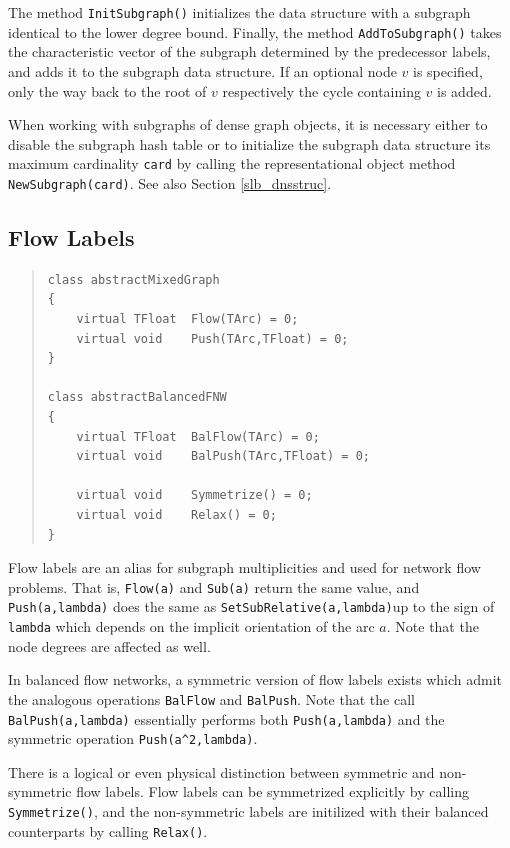 \documentclass[a4paper,11pt,twoside]{book}
\begin{document}
\begin{multicols}{2}
The method \verb/InitSubgraph()/ initializes the data structure with a
subgraph identical to the lower degree bound. Finally, the method
\verb/AddToSubgraph()/ takes the characteristic vector of the subgraph determined
by the predecessor labels, and adds it to the subgraph data structure.
If an optional node $v$ is specified, only the way back to the root of
$v$ respectively the cycle containing $v$ is added.

When working with subgraphs of dense graph objects, it is necessary either to
disable the subgraph hash table or to initialize the subgraph data structure
its maximum cardinality \verb/card/ by calling the representational object method
\verb/NewSubgraph(card)/. See also Section \ref{slb_dnsstruc}.


\subsection{Flow Labels}
\label{slb_flow}
\methods
\begin{quote}
\begin{verbatim}
class abstractMixedGraph
{
    virtual TFloat  Flow(TArc) = 0;
    virtual void    Push(TArc,TFloat) = 0;
}

class abstractBalancedFNW
{
    virtual TFloat  BalFlow(TArc) = 0;
    virtual void    BalPush(TArc,TFloat) = 0;

    virtual void    Symmetrize() = 0;
    virtual void    Relax() = 0;
}
\end{verbatim}
\end{quote}
Flow labels are an alias for subgraph multiplicities and used for network flow
problems. That is, \verb/Flow(a)/ and \verb/Sub(a)/ return the same value, and
\verb/Push(a,lambda)/ does the same as \verb/SetSubRelative(a,lambda)/up to the
sign of \verb/lambda/ which depends on the implicit orientation of the arc $a$.
Note that the node degrees are affected as well.

In balanced flow networks, a symmetric version of flow labels exists which
admit the analogous operations \verb/BalFlow/ and \verb/BalPush/. Note that
the call \verb/BalPush(a,lambda)/ essentially performs both
\verb/Push(a,lambda)/ and the symmetric operation \verb/Push(a^2,lambda)/.

There is a logical or even physical distinction
between symmetric and non-symmetric flow labels. Flow labels can be symmetrized
explicitly by calling \verb/Symmetrize()/, and the non-symmetric labels are
initilized with their balanced counterparts by calling \verb/Relax()/.



\end{multicols}
\end{document}
